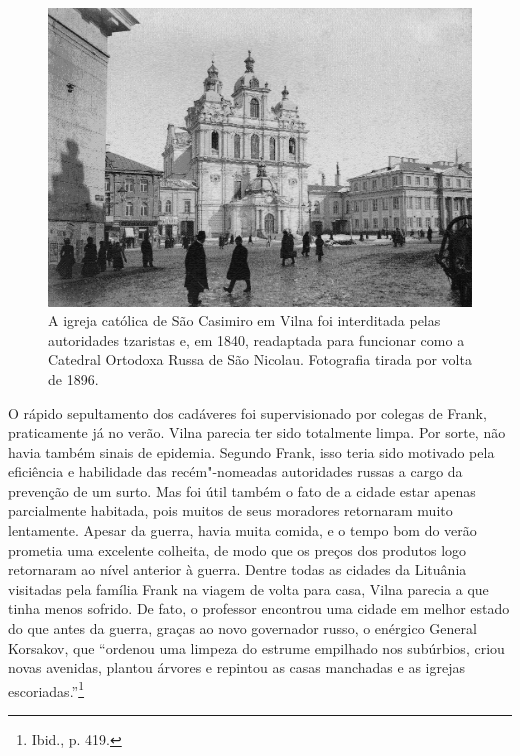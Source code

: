 
\begin{figure}[!h]
    \centering
    \includegraphics[width=\textwidth]{ilustra-07.png}
    \caption{A igreja católica de São Casimiro em Vilna foi interditada pelas autoridades tzaristas e, em 1840, readaptada para funcionar como a Catedral Ortodoxa Russa de São Nicolau. Fotografia tirada por volta de 1896.}
\end{figure}

O rápido sepultamento dos cadáveres foi supervisionado por colegas de
Frank, praticamente já no verão. Vilna parecia ter sido totalmente
limpa. Por sorte, não havia também sinais de epidemia. Segundo Frank,
isso teria sido motivado pela eficiência e habilidade das recém"-nomeadas
autoridades russas a cargo da prevenção de um surto. Mas foi útil também
o fato de a cidade estar apenas parcialmente habitada, pois muitos de
seus moradores retornaram muito lentamente. Apesar da guerra, havia
muita comida, e o tempo bom do verão prometia uma excelente colheita, de
modo que os preços dos produtos logo retornaram ao nível anterior à
guerra. Dentre todas as cidades da Lituânia visitadas pela família Frank
na viagem de volta para casa, Vilna parecia a que tinha menos sofrido.
De fato, o professor encontrou uma cidade em melhor estado do que antes
da guerra, graças ao novo governador russo, o enérgico General Korsakov,
que ``ordenou uma limpeza do estrume empilhado nos subúrbios, criou
novas avenidas, plantou árvores e repintou as casas manchadas e as
igrejas escoriadas.''\footnote{Ibid., p. 419.}

